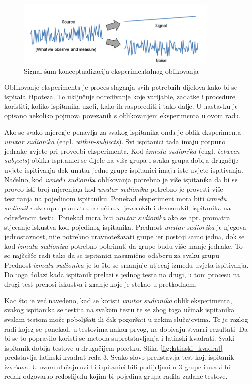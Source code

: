 \documentclass[times, utf8, zavrsni]{fer}
\begin{document}
\begin{figure}[htb]
\centering
\includegraphics[width=10cm]{img/signal.png}
\caption{Signal-šum konceptualizacija eksperimentalnog oblikovanja}
\label{fig:signal}
\end{figure}

Oblikovanje eksperimenta je proces slaganja svih potrebnih dijelova kako bi se ispitala hipoteza. To uključuje određivanje koje varijable, zadatke i procedure koristiti, koliko ispitanika uzeti, kako ih rasporediti i tako dalje. U nastavku je opisano nekoliko pojmova povezanih s oblikovanjem eksperimenta u ovom radu.

Ako se svako mjerenje ponavlja za svakog ispitanika onda je oblik eksperimenta \emph{unutar sudionika} (engl. \emph{within-subjects}). Svi ispitanici tada imaju potpuno jednake uvjete pri provedbi eksperimenta. Kod \emph{između sudionika} (engl. \emph{between-subjects}) oblika ispitanici se dijele na više grupa i svaka grupa dobija drugačije uvjete ispitivanja dok unutar jedne grupe ispitanici imaju iste uvjete ispitivanja. Načelno, kod \emph{između sudionika} oblikovanja potrebno je više ispitanika da bi se proveo isti broj mjerenja,a kod \emph{unutar sudionika} potrebno je provesti više testiranja na pojedinom ispitaniku. Ponekad eksperiment mora biti \emph{između sudionika} ako npr. promatramo učinak ljevorukih i desnorukih ispitanika na određenom testu. Ponekad mora biti \emph{unutar sudionika} ako se npr. promatra stjecanje iskustva kod pojedinog ispitanika. Prednost \emph{unutar sudionika} je njegova jednostavnost, nije potrebno uravnotežavati grupe jer postoji samo jedna, dok se kod \emph{između sudionika} potrebno pobrinuti da grupe budu više-manje jednake. To se najčešće radi tako da se ispitanici nasumično odaberu za svaku grupu. Prednost \emph{između sudionika} je to što se smanjuje utjecaj između uvjeta ispitivanja. Do toga dolazi kada ispitanik prelazi s jednog testa na drugi, u tom procesu na drugi test prenosi iskustva i znanje koje je stekao u prethodnom.

Kao što je već navedeno, kad se koristi \emph{unutar sudionika} oblik eksperimenta, svakog ispitanika se testira na svakom testu te se zbog toga učinak ispitanika svakim testom može poboljšati ili čak pogoršati u nekim slučajevima. To je razlog radi kojeg se ponekad, u testovima nakon prvog, ne dobivaju stvarni rezultati. Da bi se to popravilo koristi se metoda suprotstavljanja i latinski kvadrati. Svaki ispitanik dobija testove u drugačijem poretku. Slika \ref{fig:latinski_kvadrat} predstavlja latinski kvadrat reda $3$. Svako slovo predstavlja test koji ispitanik izvršava. U ovom slučaju svi bi ispitanici bili podijeljeni u 3 grupe i svaki bi redak odgovarao redoslijedu kojim bi pojedina grupa radila zadane testove.
\end{document}
